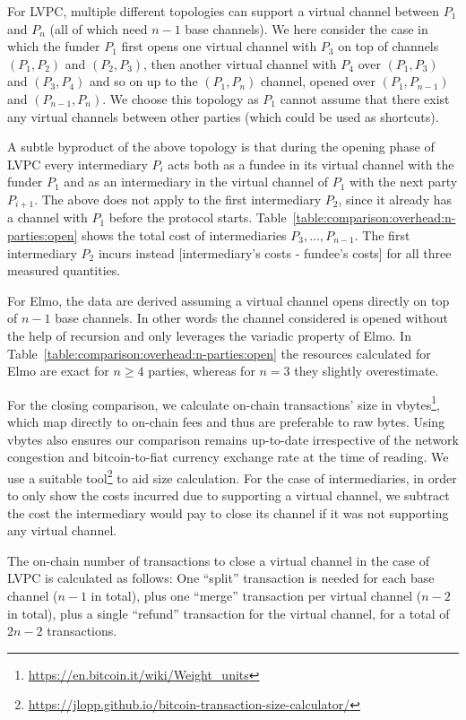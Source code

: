   For LVPC, multiple different topologies can support a virtual channel between
  $P_1$ and $P_n$ (all of which need $n-1$ base channels). We here consider the
  case in which the funder $P_1$ first opens one virtual channel with $P_3$ on
  top of channels $(P_1, P_2)$ and $(P_2, P_3)$, then another virtual channel
  with $P_4$ over $(P_1, P_3)$ and $(P_3, P_4)$ and so on up to the $(P_1, P_n)$
  channel, opened over $(P_1, P_{n-1})$ and $(P_{n-1}, P_n)$. We choose this
  topology as $P_1$ cannot assume that there exist any virtual channels between
  other parties (which could be used as shortcuts).

  A subtle byproduct of the above topology is that during the opening phase of
  LVPC every intermediary $P_i$ acts both as a fundee in its virtual channel
  with the funder $P_1$ and as an intermediary in the virtual channel of $P_1$
  with the next party $P_{i+1}$. The above does not apply to the first
  intermediary $P_2$, since it already has a channel with $P_1$ before the
  protocol starts. Table~\ref{table:comparison:overhead:n-parties:open} shows
  the total cost of intermediaries $P_3, \dots, P_{n-1}$. The first intermediary
  $P_2$ incurs instead [intermediary's costs - fundee's costs] for all three
  measured quantities.

  For Elmo, the data are derived assuming a virtual channel opens directly on
  top of $n-1$ base channels. In other words the channel considered is opened
  without the help of recursion and only leverages the variadic property of
  Elmo. In Table~\ref{table:comparison:overhead:n-parties:open} the resources
  calculated for Elmo are exact for $n \geq 4$ parties, whereas for $n = 3$ they
  slightly overestimate.

  For the closing comparison, we calculate on-chain transactions' size in
  vbytes\footnote{\url{https://en.bitcoin.it/wiki/Weight_units}}, which map
  directly to on-chain fees and thus are preferable to raw bytes. Using vbytes
  also ensures our comparison remains up-to-date irrespective of the network
  congestion and bitcoin-to-fiat currency exchange rate at the time of reading.
  We use a suitable
  tool\footnote{\url{https://jlopp.github.io/bitcoin-transaction-size-calculator/}} to aid size
  calculation. For the case of intermediaries, in order to only show
  the costs incurred due to supporting a virtual channel, we subtract the cost
  the intermediary would pay to close its channel if it was not supporting any
  virtual channel.

  The on-chain number of transactions to close a virtual channel in the case of
  LVPC is calculated as follows: One ``split'' transaction is needed for each
  base channel ($n-1$ in total), plus one ``merge'' transaction per virtual
  channel ($n-2$ in total), plus a single ``refund'' transaction for the virtual
  channel, for a total of $2n-2$ transactions.

